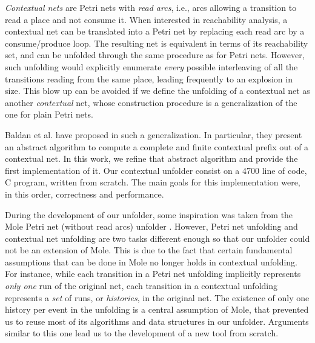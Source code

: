 \documentclass[11pt,a4paper]{article}
\begin{document}
\emph{Contextual nets} are Petri nets with \emph{read arcs}, i.e., arcs
allowing a transition to read a place and not consume it.  When interested in
reachability analysis, a contextual net can be translated into a Petri net by
replacing each read arc by a consume/produce loop.  The resulting net is
equivalent in terms of its reachability set, and can be unfolded through the
same procedure as for Petri nets.  However, such unfolding would explicitly
enumerate \emph{every} possible interleaving of all the transitions reading
from the same place, leading frequently to an explosion in size.  This blow up
can be avoided if we define the unfolding of a contextual net as another
\emph{contextual} net, whose construction procedure is a generalization of the
one for plain Petri nets.

Baldan et al. have proposed in  such a generalization.  In
particular, they present an abstract algorithm to compute a complete and finite
contextual prefix out of a contextual net.  In this work, we refine that
abstract algorithm and provide the first implementation of it.  Our contextual
unfolder consist on a 4700 line of code, C program, written from scratch.  The
main goals for this implementation were, in this order, correctness and
performance.

During the development of our unfolder, some inspiration was taken from the
Mole Petri net (without read arcs) unfolder .  However, Petri net
unfolding and contextual net unfolding are two tasks different enough so that
our unfolder could not be an extension of Mole.  This is due to the fact that
certain fundamental assumptions that can be done in Mole no longer holds in
contextual unfolding.  For instance, while each transition in a Petri net
unfolding implicitly represents \emph{only one} run of the original net, each
transition in a contextual unfolding represents a \emph{set} of runs, or
\emph{histories}, in the original net.  The existence of only one history per
event in the unfolding is a central assumption of Mole, that prevented us to
reuse most of its algorithms and data structures in our unfolder.  Arguments
similar to this one lead us to the development of a new tool from scratch.
\end{document}
